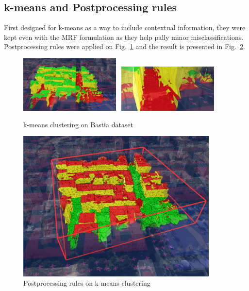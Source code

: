 \documentclass{kththesis}
\begin{document}
\subsection{k-means and Postprocessing rules}
First designed for k-means as a way to include contextual information, they were kept even with the MRF formulation as they help pally minor misclassifications. Postprocessing rules were applied on Fig.~\ref{fig:k-means_bastia} and the result is presented in Fig.~\ref{fig:bastia_postproc}.
\begin{figure}[H]
    \centering
    \includegraphics[width=0.45\textwidth]{images/Results/lod17_rouhani.png}~
    \includegraphics[width=0.45\textwidth]{images/Results/lod17_rouhani_otherview.png}
    \caption{k-means clustering on Bastia dataset}
    \label{fig:k-means_bastia}
\end{figure}
\begin{figure}[H]
    \centering
    \includegraphics[width=0.9\textwidth]{images/Results/lod17_rouhani_additional_rules.png}
    \caption{Postprocessing rules on k-means clustering}
    \label{fig:bastia_postproc}
\end{figure}
\newpage
\end{document}
